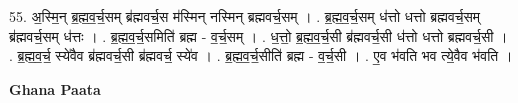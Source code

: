 \documentclass[17pt]{extarticle}
\begin{document}
55. अ॒स्मि॒न् ब्र॒ह्म॒व॒र्च॒सम् ब्र॑ह्मवर्च॒स म॑स्मिन् नस्मिन् ब्रह्मवर्च॒सम् । . ब्र॒ह्म॒व॒र्च॒सम् ध॑त्तो धत्तो ब्रह्मवर्च॒सम् ब्र॑ह्मवर्च॒सम् ध॑त्तः । . ब्र॒ह्म॒व॒र्च॒समिति॑ ब्रह्म - व॒र्च॒सम् । . ध॒त्तो॒ ब्र॒ह्म॒व॒र्च॒सी ब्र॑ह्मवर्च॒सी ध॑त्तो धत्तो ब्रह्मवर्च॒सी । . ब्र॒ह्म॒व॒र्च॒ स्ये॑वैव ब्र॑ह्मवर्च॒सी ब्र॑ह्मवर्च॒ स्ये॑व । . ब्र॒ह्म॒व॒र्च॒सीति॑ ब्रह्म - व॒र्च॒सी । . ए॒व भ॑वति भव त्ये॒वैव भ॑वति । \newline

\textbf{Ghana Paata } \newline
\end{document}
